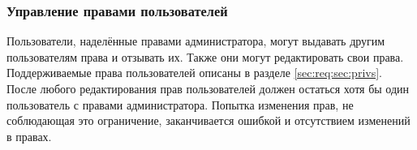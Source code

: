\subsubsection{Управление правами пользователей}
    \label{seq:req:fn:roles}
    Пользователи, наделённые правами администратора, могут выдавать другим
    пользователям права и отзывать их. Также они могут редактировать свои права.
    Поддерживаемые права пользователей описаны в разделе \ref{sec:req:sec:privs}.
    После любого редактирования прав пользователей должен остаться хотя бы один
    пользователь с правами администратора. Попытка изменения прав, не соблюдающая
    это ограничение, заканчивается ошибкой и отсутствием изменений в правах.
